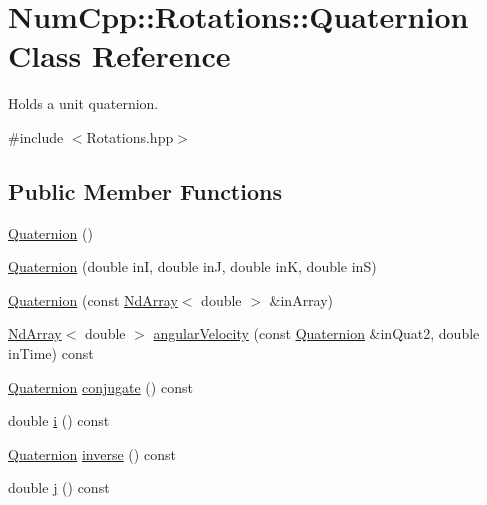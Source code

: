 \hypertarget{class_num_cpp_1_1_rotations_1_1_quaternion}{}\section{Num\+Cpp\+:\+:Rotations\+:\+:Quaternion Class Reference}
\label{class_num_cpp_1_1_rotations_1_1_quaternion}


Holds a unit quaternion.  




{\ttfamily \#include $<$Rotations.\+hpp$>$}

\subsection*{Public Member Functions}
\begin{DoxyCompactItemize}
\item 
\mbox{\hyperlink{class_num_cpp_1_1_rotations_1_1_quaternion_a5bb8e5c47451ce53e0f556ded29b0b36}{Quaternion}} ()
\item 
\mbox{\hyperlink{class_num_cpp_1_1_rotations_1_1_quaternion_acadde66b5f04043f070076c99b809c3d}{Quaternion}} (double inI, double inJ, double inK, double inS)
\item 
\mbox{\hyperlink{class_num_cpp_1_1_rotations_1_1_quaternion_a5cc3021c1ec7281f3dd81d060a160eb7}{Quaternion}} (const \mbox{\hyperlink{class_num_cpp_1_1_nd_array}{Nd\+Array}}$<$ double $>$ \&in\+Array)
\item 
\mbox{\hyperlink{class_num_cpp_1_1_nd_array}{Nd\+Array}}$<$ double $>$ \mbox{\hyperlink{class_num_cpp_1_1_rotations_1_1_quaternion_aedbc884a55f6ee44b3fcd031cc6c5fd3}{angular\+Velocity}} (const \mbox{\hyperlink{class_num_cpp_1_1_rotations_1_1_quaternion}{Quaternion}} \&in\+Quat2, double in\+Time) const
\item 
\mbox{\hyperlink{class_num_cpp_1_1_rotations_1_1_quaternion}{Quaternion}} \mbox{\hyperlink{class_num_cpp_1_1_rotations_1_1_quaternion_a12def8ee898b1f2182f376ad78a812ca}{conjugate}} () const
\item 
double \mbox{\hyperlink{class_num_cpp_1_1_rotations_1_1_quaternion_aeec666c0344f72bc55aae2d10c4c5475}{i}} () const
\item 
\mbox{\hyperlink{class_num_cpp_1_1_rotations_1_1_quaternion}{Quaternion}} \mbox{\hyperlink{class_num_cpp_1_1_rotations_1_1_quaternion_acf37c9e15c6a142a7ec3ff4756103347}{inverse}} () const
\item 
double \mbox{\hyperlink{class_num_cpp_1_1_rotations_1_1_quaternion_ae4f3baf645a22886a64668c15076d508}{j}} () const

\end{DoxyCompactItemize}
